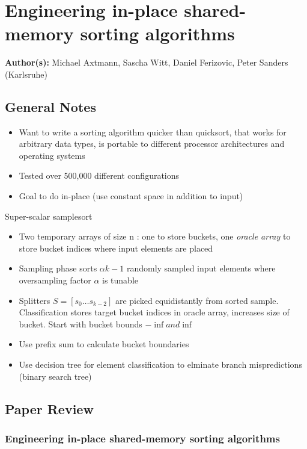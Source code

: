 \section{Engineering in-place shared-memory sorting algorithms}

\textbf{Author(s):} Michael Axtmann, Sascha Witt, Daniel Ferizovic, Peter Sanders (Karlsruhe)

\subsection{General Notes}

\begin{itemize}
    \item Want to write a sorting algorithm quicker than quicksort, that works for arbitrary data types, is portable to different processor architectures and operating systems
    \item Tested over 500,000 different configurations
    \item Goal to do in-place (use constant space in addition to input)
\end{itemize}

Super-scalar samplesort
\begin{itemize}
    \item Two temporary arrays of size n : one to store buckets, one \textit{oracle array} to store bucket indices where input elements are placed
    \item Sampling phase sorts $\alpha k - 1$ randomly sampled input elements where oversampling factor $\alpha$ is tunable
    \item Splitters $S = [s_0 \dots s_{k-2}]$ are picked equidistantly from sorted sample. Classification stores target bucket indices in oracle array, increases size of bucket. Start with bucket bounds $-\inf and \inf$
    \item Use prefix sum to calculate bucket boundaries
    \item Use decision tree for element classification to elminate branch mispredictions (binary search tree)
\end{itemize}

\newpage
\subsection{Paper Review}
\subsubsection{Engineering in-place shared-memory sorting algorithms}


